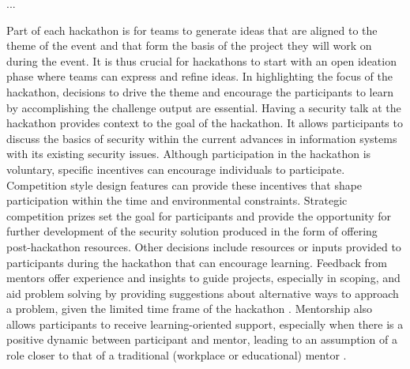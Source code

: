 \documentclass[runningheads]{llncs}
\begin{document}
...

Part of each hackathon is for teams to generate ideas that are aligned to the theme of the event and that form the basis of the project they will work on during the event. It is thus crucial for hackathons to start with an open ideation phase \cite{bohmer2015open} where teams can express and refine ideas. %
In highlighting the focus of the hackathon, decisions to drive the theme and encourage the participants to learn by accomplishing the challenge output are essential. Having a security talk at the hackathon provides context to the goal of the hackathon. It allows participants to discuss the basics of security within the current advances in information systems with its existing security issues. 
Although participation in the hackathon is voluntary, specific incentives can encourage %
individuals to participate. Competition style design features can provide these incentives that shape participation \cite{grimes2008robotics} within the time and environmental constraints. Strategic competition prizes set the goal for participants and provide the opportunity for further development of the security solution produced in the form of offering post-hackathon resources.
Other decisions include resources or inputs provided to participants during the hackathon that can encourage learning. Feedback from mentors offer experience and insights to guide projects, especially in scoping, and aid problem solving by providing suggestions about alternative ways to approach a problem, given the limited time frame of the hackathon \cite{lara2016hackathons}. Mentorship also allows participants to receive learning-oriented support, especially when there is a positive dynamic between participant and mentor, leading to an assumption of a role closer to that of a traditional (workplace or educational) mentor \cite{nolte2018support}.

\end{document}
